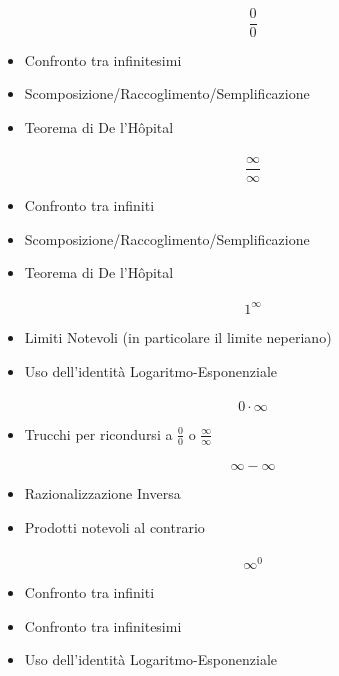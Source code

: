 \documentclass[12pt, a4paper, openany]{book}
\begin{document}
\paragraph*{}$$\frac{0}{0}$$
\begin{itemize}
	\item Confronto tra infinitesimi
	\item Scomposizione/Raccoglimento/Semplificazione
	\item Teorema di De l'Hôpital
\end{itemize}
\paragraph*{}$$\frac{\infty}{\infty}$$
\begin{itemize}
	\item Confronto tra infiniti
	\item Scomposizione/Raccoglimento/Semplificazione
	\item Teorema di De l'Hôpital
\end{itemize}
\paragraph*{}$$1^\infty$$
\begin{itemize}
	\item Limiti Notevoli (in particolare il limite neperiano)
	\item Uso dell'identità Logaritmo-Esponenziale
\end{itemize}
\paragraph*{}$$0\cdot \infty$$
\begin{itemize}
	\item Trucchi per ricondursi a $\frac{0}{0}$ o $\frac{\infty}{\infty}$
\end{itemize}
\paragraph*{}$$\infty-\infty$$
\begin{itemize}
	\item Razionalizzazione Inversa
	\item Prodotti notevoli al contrario
\end{itemize}
\paragraph*{}$$\infty^0$$
\begin{itemize}
	\item Confronto tra infiniti
	\item Confronto tra infinitesimi
	\item Uso dell'identità Logaritmo-Esponenziale
\end{itemize}
\end{document}
